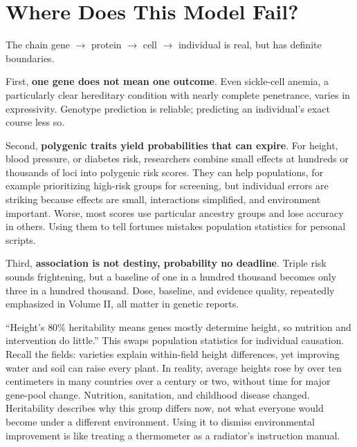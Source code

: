 \section{Where Does This Model Fail?}

The chain gene $\rightarrow$ protein $\rightarrow$ cell $\rightarrow$ individual is real, but has definite boundaries.

First, \textbf{one gene does not mean one outcome}. Even sickle-cell anemia, a particularly clear hereditary condition with nearly complete penetrance, varies in expressivity. Genotype prediction is reliable; predicting an individual's exact course less so.

Second, \textbf{polygenic traits yield probabilities that can expire}. For height, blood pressure, or diabetes risk, researchers combine small effects at hundreds or thousands of loci into polygenic risk scores. They can help populations, for example prioritizing high-risk groups for screening, but individual errors are striking because effects are small, interactions simplified, and environment important. Worse, most scores use particular ancestry groups and lose accuracy in others. Using them to tell fortunes mistakes population statistics for personal scripts.

Third, \textbf{association is not destiny, probability no deadline}. Triple risk sounds frightening, but a baseline of one in a hundred thousand becomes only three in a hundred thousand. Dose, baseline, and evidence quality, repeatedly emphasized in Volume II, all matter in genetic reports.

\begin{wuqu}
``Height's $80\%$ heritability means genes mostly determine height, so nutrition and intervention do little.'' This swaps population statistics for individual causation. Recall the fields: varieties explain within-field height differences, yet improving water and soil can raise every plant. In reality, average heights rose by over ten centimeters in many countries over a century or two, without time for major gene-pool change. Nutrition, sanitation, and childhood disease changed. Heritability describes why this group differs now, not what everyone would become under a different environment. Using it to dismiss environmental improvement is like treating a thermometer as a radiator's instruction manual.
\end{wuqu}

